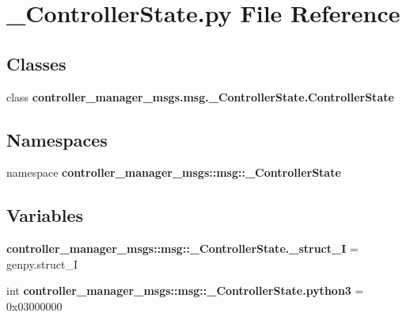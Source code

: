 \section{\-\_\-\-Controller\-State.\-py \-File \-Reference}
\label{__ControllerState_8py}
\subsection*{\-Classes}
\begin{DoxyCompactItemize}
\item 
class {\bf controller\-\_\-manager\-\_\-msgs.\-msg.\-\_\-\-Controller\-State.\-Controller\-State}
\end{DoxyCompactItemize}
\subsection*{\-Namespaces}
\begin{DoxyCompactItemize}
\item 
namespace {\bf controller\-\_\-manager\-\_\-msgs\-::msg\-::\-\_\-\-Controller\-State}
\end{DoxyCompactItemize}
\subsection*{\-Variables}
\begin{DoxyCompactItemize}
\item 
{\bf controller\-\_\-manager\-\_\-msgs\-::msg\-::\-\_\-\-Controller\-State.\-\_\-struct\-\_\-\-I} = genpy.\-struct\-\_\-\-I
\item 
int {\bf controller\-\_\-manager\-\_\-msgs\-::msg\-::\-\_\-\-Controller\-State.\-python3} = 0x03000000
\end{DoxyCompactItemize}
